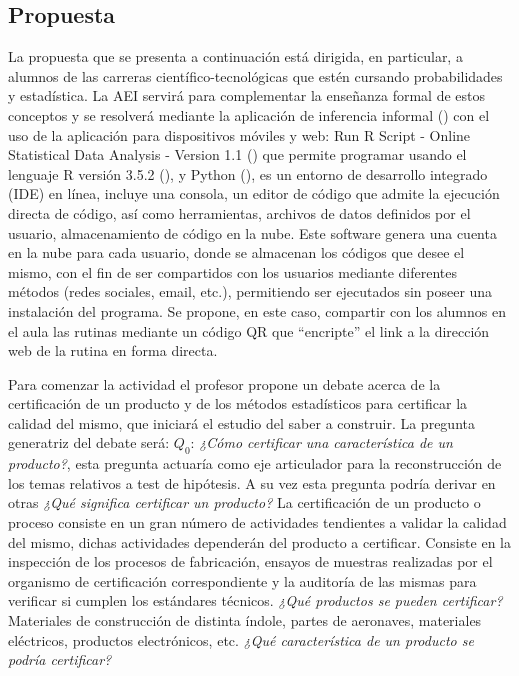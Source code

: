 \documentclass[oneside,spanish]{amsart}
\numberwithin{equation}{section}
\theoremstyle{definition}
\begin{document}
\subsection{Propuesta}

La propuesta que se presenta a continuación está dirigida, en particular, a alumnos de las carreras científico-tecnológicas que estén cursando probabilidades y estadística. La AEI servirá para complementar la enseñanza formal de estos conceptos y se resolverá  mediante la aplicación de inferencia informal (\citet{zieffler08}) con  el uso de la aplicación para dispositivos móviles y web: Run R Script - Online Statistical Data Analysis - Version 1.1 (\cite{liila18}) que permite programar usando el lenguaje R versión 3.5.2 (\cite{teamrc21}), y Python (\cite{python17}), es un entorno de desarrollo integrado (IDE) en línea, incluye una consola, un editor de código que admite la ejecución directa de código, así como herramientas, archivos de datos definidos por el usuario, almacenamiento de código en la nube. Este software genera una cuenta en la nube para cada usuario, donde se almacenan los códigos que desee el mismo, con el fin de ser compartidos con los usuarios mediante diferentes métodos (redes sociales, email, etc.), permitiendo ser ejecutados sin poseer una instalación del programa. Se propone, en este caso, compartir con los alumnos en el aula las rutinas mediante un código QR que “encripte” el link a la dirección web de la rutina en forma directa. 

Para comenzar la actividad el profesor propone un debate acerca de la certificación de un producto y de los métodos estadísticos para certificar la calidad del mismo, que iniciará el estudio del saber a construir. La pregunta generatriz del debate será: $Q_0$: \textit{¿Cómo certificar una característica de un producto?}, esta pregunta actuaría como eje articulador para la reconstrucción de los temas relativos a test de hipótesis. A su vez esta pregunta podría derivar en otras \textit{¿Qué significa certificar un producto?} La certificación de un producto o proceso consiste en un gran número de actividades tendientes a validar la calidad del mismo, dichas actividades dependerán del producto a certificar. Consiste en la inspección de los procesos de fabricación, ensayos de muestras realizadas por el organismo de certificación correspondiente y la auditoría de las mismas para verificar si cumplen los estándares técnicos. \textit{¿Qué productos se pueden certificar?} Materiales de construcción de distinta índole, partes de aeronaves, materiales eléctricos, productos electrónicos, etc. \textit{¿Qué característica de un producto se podría certificar?}
\end{document}
